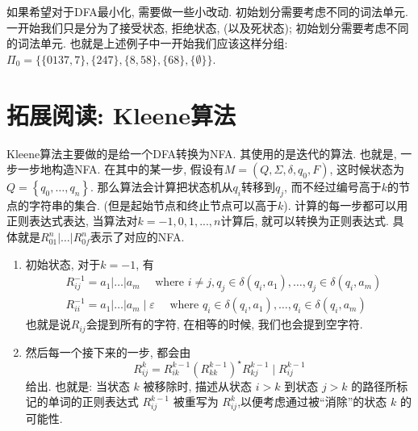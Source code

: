 \documentclass{ctexart}
\begin{document}
如果希望对于DFA最小化, 需要做一些小改动. 初始划分需要考虑不同的词法单元. 一开始我们只是分为了接受状态, 拒绝状态, (以及死状态); 初始划分需要考虑不同的词法单元. 也就是上述例子中一开始我们应该这样分组: $\Pi_0=\{\{0137,7\},\{247\},\{8,58\},\{68\},\{\emptyset\}\}$.

\section{拓展阅读: Kleene算法} 

Kleene算法主要做的是给一个DFA转换为NFA. 其使用的是迭代的算法. 也就是, 一步一步地构造NFA. 在其中的某一步, 假设有$M=\left(Q, \Sigma, \delta, q_0, F\right)$, 这时候状态为$Q=\left\{q_0, \ldots, q_n\right\}$. 那么算法会计算把状态机从$q_i$转移到$q_j$, 而不经过编号高于$k$的节点的字符串的集合. (但是起始节点和终止节点可以高于$k$). 计算的每一步都可以用正则表达式表达, 当算法对$k=-1, 0, 1, ..., n$计算后, 就可以转换为正则表达式. 具体就是$R_{01}^n|\ldots| R_{0 f}^n$表示了对应的NFA. 

\begin{enumerate}
    \item 初始状态, 对于$k=-1$, 有
$$
\begin{aligned}
&R_{i j}^{-1}=a_1|\ldots| a_m \quad \text { where }i\neq j, q_j \in \delta\left(q_i, a_1\right), \ldots, q_j \in \delta\left(q_i, a_m\right)\\
&R_{i i}^{-1}=a_1|\ldots| a_m \mid \varepsilon \quad \text { where } q_i \in \delta\left(q_i, a_1\right), \ldots, q_i \in \delta\left(q_i, a_m\right)
\end{aligned}
$$
也就是说$R_{ij}$会提到所有的字符, 在相等的时候, 我们也会提到空字符.


\item  然后每一个接下来的一步, 都会由
    $$
R_{i j}^k=R_{i k}^{k-1}\left(R_{k k}^{k-1}\right)^{\star} R_{k j}^{k-1} \mid R_{i j}^{k-1}
$$
给出. 
也就是: 当状态 $k$ 被移除时, 描述从状态 $i > k$ 到状态 $j > k$ 的路径所标记的单词的正则表达式 $R^{k-1}_{ij}$ 被重写为 $R^k_{ij}$,以便考虑通过被“消除”的状态 $k$ 的可能性.
\end{enumerate}
\end{document}
